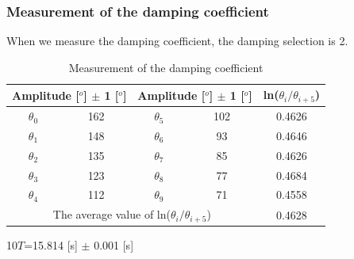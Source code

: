 \documentclass[12pt]{article}
\begin{document}
\subsubsection{Measurement of the damping coefficient}
When we measure the damping coefficient, the damping selection is 2.
\begin{table}[H]
\centering
\begin{tabular}{|c|c|c|c|c|}
\hline
\multicolumn{2}{|c|}{Amplitude [$^o$] $\pm$ 1 [$^o$]} & \multicolumn{2}{c|}{Amplitude [$^o$] $\pm$ 1 [$^o$]} & ln($\theta_i/\theta_{i+5}$)  \\ \hline
$\theta_0$           &162           & $\theta_5$          &102           &0.4626  \\ \hline
$\theta_1$           &148           & $\theta_6$          &93           &0.4646  \\ \hline
$\theta_2$           &135        & $\theta_7$          &85           &0.4626  \\ \hline
$\theta_3$           &123        & $\theta_8$          &77           &0.4684  \\ \hline
$\theta_4$           &112           & $\theta_9$          &71           &0.4558  \\ \hline
\multicolumn{4}{|c|}{The average value of ln($\theta_i/\theta_{i+5}$)}                         &0.4628  \\ \hline
\end{tabular}
\caption{Measurement of the damping coefficient}
\end{table}
10$T$=15.814 [s] $\pm$ 0.001 [s]
\end{document}
